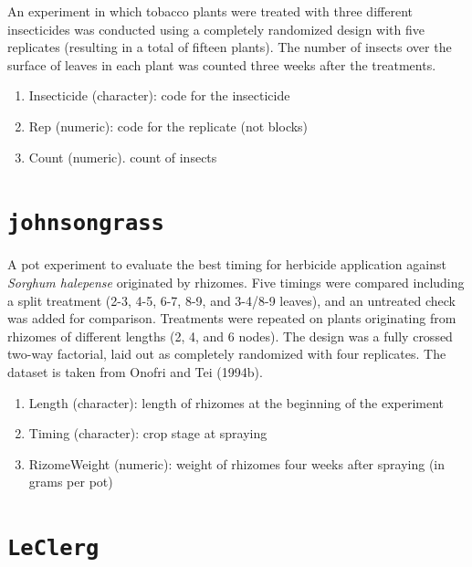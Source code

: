 \documentclass[
  letterpaper,
  DIV=11,
  numbers=noendperiod]{scrreprt}
\providecommand{\tightlist}{%
  \setlength{\itemsep}{0pt}\setlength{\parskip}{0pt}}
\begin{document}

An experiment in which tobacco plants were treated with three different
insecticides was conducted using a completely randomized design with
five replicates (resulting in a total of fifteen plants). The number of
insects over the surface of leaves in each plant was counted three weeks
after the treatments.

\begin{enumerate}
\def\labelenumi{\arabic{enumi}.}
\tightlist
\item
  Insecticide (character): code for the insecticide
\item
  Rep (numeric): code for the replicate (not blocks)
\item
  Count (numeric). count of insects
\end{enumerate}

\section*{\texorpdfstring{\texttt{johnsongrass}}{johnsongrass}}\label{johnsongrass}


A pot experiment to evaluate the best timing for herbicide application
against \emph{Sorghum halepense} originated by rhizomes. Five timings
were compared including a split treatment (2-3, 4-5, 6-7, 8-9, and
3-4/8-9 leaves), and an untreated check was added for comparison.
Treatments were repeated on plants originating from rhizomes of
different lengths (2, 4, and 6 nodes). The design was a fully crossed
two-way factorial, laid out as completely randomized with four
replicates. The dataset is taken from Onofri and Tei (1994b).

\begin{enumerate}
\def\labelenumi{\arabic{enumi}.}
\tightlist
\item
  Length (character): length of rhizomes at the beginning of the
  experiment
\item
  Timing (character): crop stage at spraying
\item
  RizomeWeight (numeric): weight of rhizomes four weeks after spraying
  (in grams per pot)
\end{enumerate}

\section*{\texorpdfstring{\texttt{LeClerg}}{LeClerg}}\label{leclerg}
\end{document}
